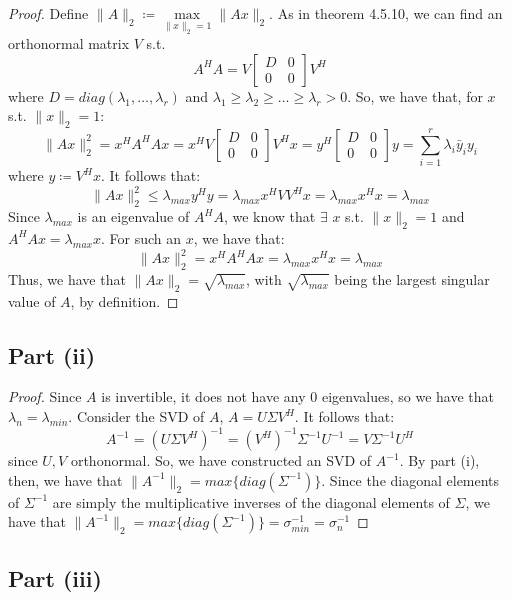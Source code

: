 \documentclass{article}
\begin{document}
\begin{proof}
Define $\|A\|_2 \coloneqq \max\limits_{\|x\|_2 = 1} \|Ax\|_2$. As in theorem 4.5.10, we can find an orthonormal matrix $V$ s.t.
$$A^{H}A = V\begin{bmatrix} D & 0 \\ 0 & 0\end{bmatrix}V^{H}$$
where $D = diag(\lambda_1, \dots, \lambda_r)$ and $\lambda_1 \geq \lambda_2 \geq \dots \geq \lambda_r > 0$. So, we have that, for $x$ s.t. $\|x\|_2 = 1$:
$$\|Ax\|_2^2 = x^{H}A^{H}Ax = x^{H}V\begin{bmatrix} D & 0 \\ 0 & 0\end{bmatrix}V^{H}x = y^{H}\begin{bmatrix} D & 0 \\ 0 & 0\end{bmatrix}y = \sum\limits_{i = 1}^r \lambda_{i}\bar y_{i}y_{i}$$
where $y \coloneqq V^{H}x$. It follows that:
$$\|Ax\|_2^2 \leq \lambda_{max}y^{H}y = \lambda_{max}x^{H}VV^{H}x = \lambda_{max}x^{H}x = \lambda_{max}$$
Since $\lambda_{max}$ is an eigenvalue of $A^{H}A$, we know that $\exists$ $x$ s.t. $\|x\|_2 = 1$ and $A^{H}Ax = \lambda_{max}x$. For such an $x$, we have that:
$$\|Ax\|_2^2 = x^{H}A^{H}Ax = \lambda_{max} x^{H}x = \lambda_{max}$$
Thus, we have that $\|Ax\|_2 = \sqrt{\lambda_{max}}$, with $\sqrt{\lambda_{max}}$ being the largest singular value of $A$, by definition.
\end{proof}

\subsection*{Part (ii)}

\begin{proof}
Since $A$ is invertible, it does not have any $0$ eigenvalues, so we have that $\lambda_n = \lambda_{min}$. Consider the SVD of $A$, $A = U\Sigma V^H$. It follows that:
$$A^{-1} = (U\Sigma V^H)^{-1} = (V^H)^{-1}\Sigma^{-1}U^{-1} = V\Sigma^{-1}U^H$$
since $U, V$ orthonormal. So, we have constructed an SVD of $A^{-1}$. By part (i), then, we have that $\|A^{-1}\|_2 = max\{diag(\Sigma^{-1})\}$. Since the diagonal elements of $\Sigma^{-1}$ are simply the multiplicative inverses of the diagonal elements of $\Sigma$, we have that $\|A^{-1}\|_2 = max\{diag(\Sigma^{-1})\} = \sigma_{min}^{-1} = \sigma_n^{-1}$
\end{proof}

\subsection*{Part (iii)}
\end{document}
